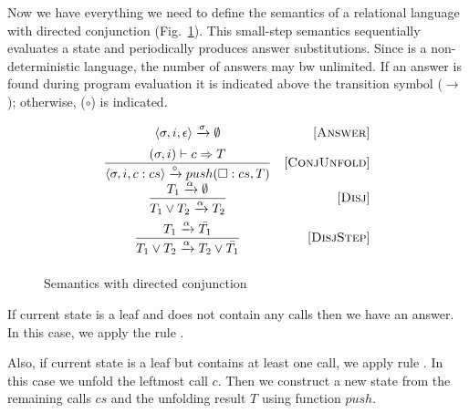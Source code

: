 
Now we have everything we need to define the semantics of a relational language with directed conjunction (Fig.~\ref{fair:classic-semantics}). This small-step semantics sequentially
evaluates a state and periodically produces answer substitutions. Since \mk is a non-deterministic language, the number of answers may bw unlimited.
If an answer is found during program evaluation it is indicated above the transition symbol ($\xrightarrow{}$); otherwise, ($\circ$) is indicated.

\begin{figure}[h!]
\[\begin{array}{cr}
     {\langle \sigma, i, \epsilon \rangle \xrightarrow{\sigma} \emptyset}  
&     \mbox{[\textsc{Answer}]} \\[2mm]
\dfrac{(\sigma, i) \vdash c \Rightarrow T}
      {\langle \sigma, i, c : cs \rangle \xrightarrow{\circ} push(\Box : cs, T)}
&     \mbox{[\textsc{ConjUnfold}]} \\[2mm]
\dfrac{T_1 \xrightarrow{\alpha} \emptyset}
      {T_1 \lor T_2 \xrightarrow{\alpha} T_2}
&     \mbox{[\textsc{Disj}]} \\[4mm]
\dfrac{T_1 \xrightarrow{\alpha} \bar{T_1}}
      {T_1 \lor T_2 \xrightarrow{\alpha} T_2 \lor\bar{T_1}}
&     \mbox{[\textsc{DisjStep}]} \\[4mm]
\end{array}\]
\caption{Semantics with directed conjunction}
\label{fair:classic-semantics}
\end{figure}

If current state is a leaf and does not contain any calls then we have an answer. In this case, we apply the rule .

Also, if current state is a leaf but contains at least one call, we apply rule . In this case we unfold the leftmost call $c$.
Then we construct a new state from the remaining calls $cs$ and the unfolding result $T$ using function $push$.

